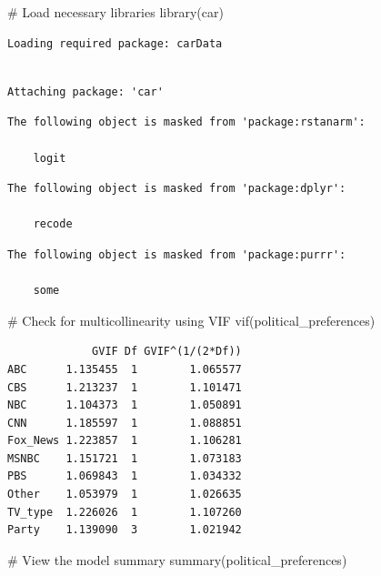 \documentclass[
  letterpaper,
  DIV=11,
  numbers=noendperiod]{scrartcl}
\newenvironment{Shaded}{\begin{snugshade}}{\end{snugshade}}
\newcommand{\CommentTok}[1]{\textcolor[rgb]{0.37,0.37,0.37}{#1}}
\newcommand{\FunctionTok}[1]{\textcolor[rgb]{0.28,0.35,0.67}{#1}}
\newcommand{\NormalTok}[1]{\textcolor[rgb]{0.00,0.23,0.31}{#1}}
\begin{document}
\begin{Shaded}
\begin{Highlighting}[]
\CommentTok{\# Load necessary libraries}
\FunctionTok{library}\NormalTok{(car)}
\end{Highlighting}
\end{Shaded}

\begin{verbatim}
Loading required package: carData
\end{verbatim}

\begin{verbatim}

Attaching package: 'car'
\end{verbatim}

\begin{verbatim}
The following object is masked from 'package:rstanarm':

    logit
\end{verbatim}

\begin{verbatim}
The following object is masked from 'package:dplyr':

    recode
\end{verbatim}

\begin{verbatim}
The following object is masked from 'package:purrr':

    some
\end{verbatim}

\begin{Shaded}
\begin{Highlighting}[]
\CommentTok{\# Check for multicollinearity using VIF}
\FunctionTok{vif}\NormalTok{(political\_preferences)}
\end{Highlighting}
\end{Shaded}

\begin{verbatim}
             GVIF Df GVIF^(1/(2*Df))
ABC      1.135455  1        1.065577
CBS      1.213237  1        1.101471
NBC      1.104373  1        1.050891
CNN      1.185597  1        1.088851
Fox_News 1.223857  1        1.106281
MSNBC    1.151721  1        1.073183
PBS      1.069843  1        1.034332
Other    1.053979  1        1.026635
TV_type  1.226026  1        1.107260
Party    1.139090  3        1.021942
\end{verbatim}

\begin{Shaded}
\begin{Highlighting}[]
\CommentTok{\# View the model summary}
\FunctionTok{summary}\NormalTok{(political\_preferences)}
\end{Highlighting}
\end{Shaded}
\end{document}
